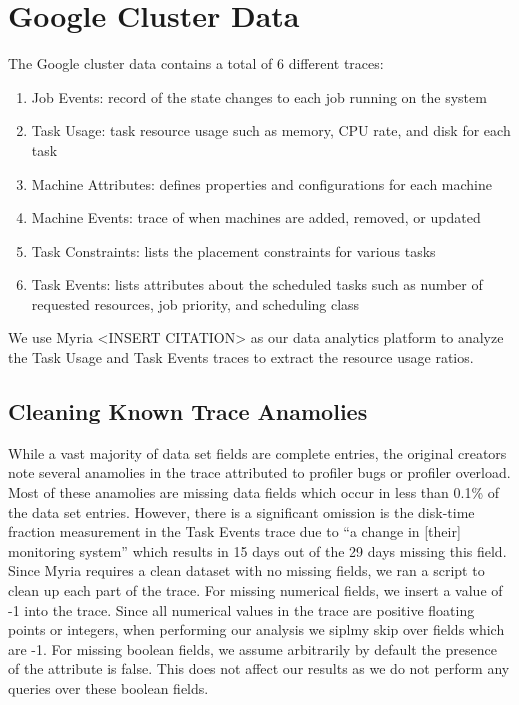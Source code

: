 \documentclass{sig-alternate}
\begin{document}


\section{Google Cluster Data}

The Google cluster data contains a total of 6 different traces:
\begin{enumerate}
\item Job Events: record of the state changes to each job running on the system
\item Task Usage: task resource usage such as memory, CPU rate, and disk for each task
\item Machine Attributes: defines properties and configurations for each machine
\item Machine Events: trace of when machines are added, removed, or updated
\item Task Constraints: lists the placement constraints for various tasks
\item Task Events: lists attributes about the scheduled tasks such as number of requested resources, job priority, and scheduling class
\end{enumerate}
We use Myria <INSERT CITATION> as our data analytics platform to analyze the Task Usage and Task Events traces to extract the resource usage ratios.

\subsection{Cleaning Known Trace Anamolies}

While a vast majority of data set fields are complete entries, the original creators note several anamolies in the trace attributed to profiler bugs or profiler overload.
Most of these anamolies are missing data fields which occur in less than 0.1\% of the data set entries.
However, there is a significant omission is the disk-time fraction measurement in the Task Events trace due to ``a change in [their] monitoring system'' which results in 15 days out of the 29 days missing this field.
Since Myria requires a clean dataset with no missing fields, we ran a script to clean up each part of the trace.
For missing numerical fields, we insert a value of -1 into the trace.
Since all numerical values in the trace are positive floating points or integers, when performing our analysis we siplmy skip over fields which are -1.
For missing boolean fields, we assume arbitrarily by default the presence of the attribute is false.
This does not affect our results as we do not perform any queries over these boolean fields.
\end{document}
